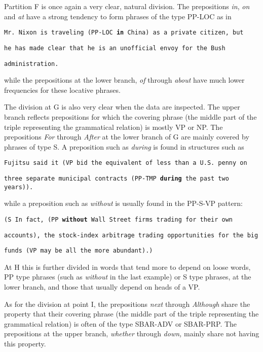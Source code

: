 Partition F is once again a very clear, natural division. The prepositions
{\em in}, {\em on} and {\em at} have a strong tendency to form phrases of the type
PP-LOC as in

\hspace*{4mm}
{\tt Mr. Nixon is traveling (PP-LOC {\bf in} China) as a private citizen, but}

\hspace*{4mm}
{\tt he has made clear that he is an unofficial envoy for the Bush}

\hspace*{4mm}
{\tt administration.}

\noindent
while the prepositions at the lower branch, {\em of} through {\em about} have
much lower frequencies for these locative phrases.

The division at G is also very clear when the data are inspected. The
upper branch reflects prepositions for which the covering phrase (the
middle part of the triple representing the grammatical relation) is
mostly VP or NP. The prepositions {\em For} through {\em After} at the
lower branch of G are mainly covered by phrases of type S. A preposition
such as {\em during} is found in structures such as

\hspace*{4mm}
{\tt Fujitsu said it (VP bid the equivalent of less than a U.S. penny on}

\hspace*{4mm}
{\tt three separate municipal contracts (PP-TMP {\bf during} the past two years)).}

\noindent
while a preposition such as {\em without} is usually found in the
PP-S-VP pattern:

\hspace*{4mm}
{\tt (S In fact, (PP {\bf without} Wall Street firms trading for their own}

\hspace*{4mm}
{\tt accounts), the stock-index arbitrage trading opportunities for the big}

\hspace*{4mm}
{\tt funds (VP may be all the more abundant).)}

At H this is further divided in words that tend more to depend on
loose words, PP type phrases (such as {\em without} in the last example)
or S type phrases, at the lower branch, and those that usually depend
on heads of a VP.

As for the division at point I, the prepositions {\em next} through
{\em Although} share the property that their covering phrase (the middle
part of the triple representing the grammatical relation) is often of
the type SBAR-ADV or SBAR-PRP.  The prepositions at the upper branch,
{\em whether} through {\em down,} mainly share not having this property. 

